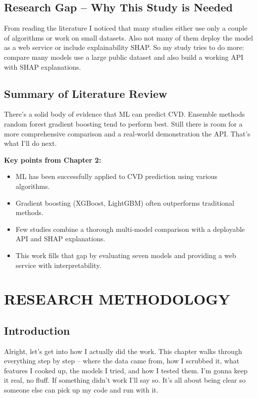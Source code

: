 \documentclass[11pt, a4paper, oneside]{book}
\begin{document}
\section{Research Gap – Why This Study is Needed}
From reading the literature I noticed that many studies either use only a couple of algorithms or work on small datasets. Also not many of them deploy the model as a web service or include explainability SHAP. So my study tries to do more: compare many models use a large public dataset and also build a working API with SHAP explanations.

\section{Summary of Literature Review}
There's a solid body of evidence that ML can predict CVD. Ensemble methods random forest gradient boosting tend to perform best. Still there is room for a more comprehensive comparison and a real‑world demonstration the API. That's what I'll do next.

\begin{takeaway}
\textbf{Key points from Chapter 2:}
\begin{itemize}
  \item ML has been successfully applied to CVD prediction using various algorithms.
  \item Gradient boosting (XGBoost, LightGBM) often outperforms traditional methods.
  \item Few studies combine a thorough multi‑model comparison with a deployable API and SHAP explanations.
  \item This work fills that gap by evaluating seven models and providing a web service with interpretability.
\end{itemize}
\end{takeaway}

\chapter{RESEARCH METHODOLOGY}

\section{Introduction}
Alright, let’s get into how I actually did the work. This chapter walks through everything step by step – where the data came from, how I scrubbed it, what features I cooked up, the models I tried, and how I tested them. I’m gonna keep it real, no fluff. If something didn’t work I’ll say so. It’s all about being clear so someone else can pick up my code and run with it.
\end{document}
